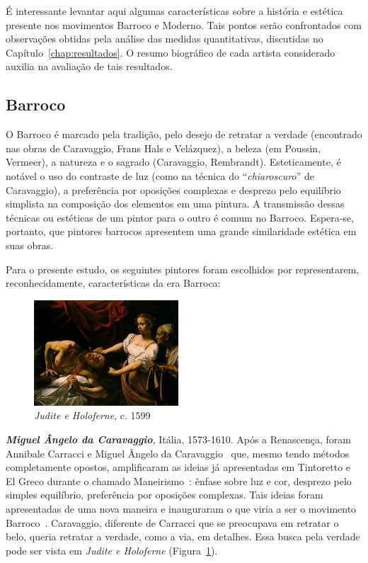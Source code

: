 É interessante levantar aqui algumas características sobre a história e estética
presente nos movimentos Barroco e Moderno. Tais pontos serão confrontados com
observações obtidas pela análise das medidas quantitativas, discutidas no
Capítulo~\ref{chap:resultados}. O resumo biográfico de cada artista considerado
auxilia na avaliação de tais resultados.

\subsection{Barroco}

O Barroco é marcado pela tradição, pelo desejo de retratar a verdade (encontrado
nas obras de Caravaggio, Frans Hals e Velázquez), a beleza (em Poussin,
Vermeer), a natureza e o sagrado (Caravaggio, Rembrandt). Esteticamente, é
notável o uso do contraste de luz (como na técnica do ``\textit{chiaroscuro}''
de Caravaggio), a preferência por oposições complexas e desprezo pelo equilíbrio
simplista na composição dos elementos em uma pintura. A transmissão dessas
técnicas ou estéticas de um pintor para o outro é comum no Barroco. Espera-se,
portanto, que pintores barrocos apresentem uma grande similaridade estética em
suas obras.~\cite{gombrich,hills,gardner}

Para o presente estudo, os seguintes pintores foram escolhidos por
representarem, reconhecidamente, características da era Barroca:

\begin{figure}
  \begin{center}
    \includegraphics[width=0.48\textwidth]{figs/caravaggio_judite.png}
  \end{center}
  \caption{\emph{Judite e Holoferne}, c. 1599}
  \label{fig:caravaggio:judite}
\end{figure}

\textbf{\emph{Miguel Ângelo da Caravaggio}}, Itália, 1573-1610.  Após a
Renascença, foram Annibale Carracci e Miguel Ângelo da Caravaggio~\cite{bayer}
que, mesmo tendo métodos completamente opostos, amplificaram as ideias já
apresentadas em Tintoretto e El Greco durante o chamado
Maneirismo~\cite{tatarkiewicz}: ênfase sobre luz e cor, desprezo pelo simples
equilíbrio, preferência por oposições complexas. Tais ideias foram apresentadas
de uma nova maneira e inauguraram o que viria a ser o movimento
Barroco~\cite{hills}. Caravaggio, diferente de Carracci que se preocupava em
retratar o belo, queria retratar a verdade, como a via, em detalhes. Essa busca
pela verdade pode ser vista em \emph{Judite e Holoferne}
(Figura~\ref{fig:caravaggio:judite}).~\cite{puglisi,caravaggio}

